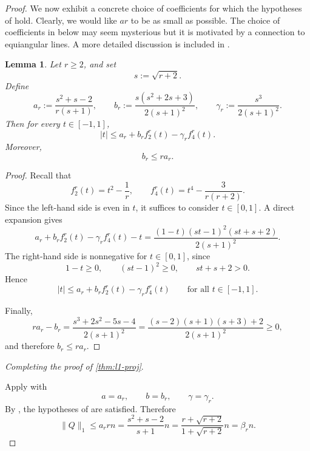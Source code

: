 \documentclass[10pt,a4paper]{amsart}
\newtheorem{lemma}{Lemma}
\begin{document}
\begin{proof}
We now exhibit a concrete choice of coefficients for which the hypotheses of  hold. Clearly, we would like $ar$ to be as small as possible. The choice of coefficients in  below may seem mysterious but it is motivated by a connection to equiangular lines. A more detailed discussion is included in . 


\begin{lemma}\label{lem:scalar-majorant}
Let \(r\ge 2\), and set
\[
s:=\sqrt{r+2}.
\]
Define
\[
a_r:=\frac{s^2+s-2}{r(s+1)},\qquad
b_r:=\frac{s(s^2+2s+3)}{2(s+1)^2},\qquad
\gamma_r:=\frac{s^3}{2(s+1)^2}.
\]
Then for every \(t\in[-1,1]\),
\[
|t|\le a_r+b_r f_2^r(t)-\gamma_r f_4^r(t).
\]
Moreover,
\[
b_r\le ra_r.
\]
\end{lemma}

\begin{proof}
Recall that
\[
f_2^r(t)=t^2-\frac1r,\qquad
f_4^r(t)=t^4-\frac{3}{r(r+2)}.
\]
Since the left-hand side is even in \(t\), it suffices to consider \(t\in[0,1]\).
A direct expansion gives
\[
a_r+b_r f_2^r(t)-\gamma_r f_4^r(t)-t
=
\frac{(1-t)(st-1)^2(st+s+2)}{2(s+1)^2}.
\]
The right-hand side is nonnegative for \(t\in[0,1]\), since
\[
1-t\ge 0,\qquad (st-1)^2\ge 0,\qquad st+s+2>0.
\]
Hence
\[
|t|\le a_r+b_r f_2^r(t)-\gamma_r f_4^r(t)
\qquad\text{for all } t\in[-1,1].
\]

Finally,
\[
ra_r-b_r
=
\frac{s^3+2s^2-5s-4}{2(s+1)^2}
=
\frac{(s-2)(s+1)(s+3)+2}{2(s+1)^2}\ge 0,
\]
and therefore \(b_r\le ra_r\).
\end{proof}



\noindent\textit{Completing the proof of \cref{thm:l1-proj}}.

Apply  with
\[
a=a_r,\qquad b=b_r,\qquad \gamma=\gamma_r.
\]
By , the hypotheses of  are satisfied. Therefore
\[
\|Q\|_1\le a_r r n = \frac{s^2 + s -2}{s+1} n = \frac{r+\sqrt{r+2}}{1+\sqrt{r+2}} n = \beta_r n.
\]

\end{proof}
\end{document}
